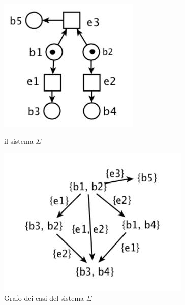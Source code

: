 \documentclass[a4paper,12pt, oneside]{book}
\begin{document}
\begin{figure}[H]
  \centering
  \includegraphics[scale = 0.5]{img/seq1.jpg}
  \caption{il sistema $\Sigma$}
  \includegraphics[scale = 0.5]{img/seq2.jpg}
  \caption{Grafo dei casi del sistema $\Sigma$}
\end{figure}
\newpage
\end{document}
